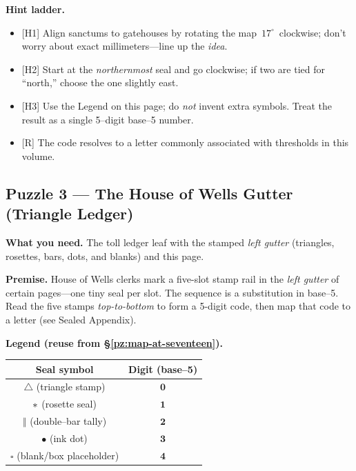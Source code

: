 \documentclass[11pt]{article}
\numberwithin{equation}{section} %
\theoremstyle{plain} %
\theoremstyle{definition} %
\theoremstyle{remark} %
\begin{document}
\medskip
\noindent\textbf{Hint ladder.}
\begin{itemize}\setlength\itemsep{0.25em}
  \item \textsc{[H1]} Align sanctums to gatehouses by rotating the map \(\,17^\circ\,\) clockwise; don’t worry about exact millimeters—line up the \emph{idea}.
  \item \textsc{[H2]} Start at the \emph{northernmost} seal and go clockwise; if two are tied for “north,” choose the one slightly east.
  \item \textsc{[H3]} Use the Legend on this page; do \emph{not} invent extra symbols. Treat the result as a single 5–digit base–5 number.
  \item \textsc{[R]} The code resolves to a letter commonly associated with thresholds in this volume.
\end{itemize}

\subsection{Puzzle 3 — The House of Wells Gutter (Triangle Ledger)}
\label{pz:triangle-ledger}

\noindent\textbf{What you need.} The toll ledger leaf with the stamped \emph{left gutter} (triangles, rosettes, bars, dots, and blanks) and this page.

\medskip
\noindent\textbf{Premise.} House of Wells clerks mark a five-slot stamp rail in the \emph{left gutter} of certain pages—one tiny seal per slot. The sequence is a substitution in base–5. Read the five stamps \emph{top-to-bottom} to form a 5-digit code, then map that code to a letter (see Sealed Appendix).

\medskip
\noindent\textbf{Legend (reuse from \S\ref{pz:map-at-seventeen}).}
\begin{center}
\begin{tabular}{c|c}
\textbf{Seal symbol} & \textbf{Digit (base–5)} \\
\hline
\(\triangle\) (triangle stamp) & \(\mathbf{0}\) \\
\(\large\ast\) (rosette seal) & \(\mathbf{1}\) \\
\(\Vert\) (double–bar tally) & \(\mathbf{2}\) \\
\(\bullet\) (ink dot) & \(\mathbf{3}\) \\
\(\square\) (blank/box placeholder) & \(\mathbf{4}\) \\
\end{tabular}
\end{center}
\end{document}
